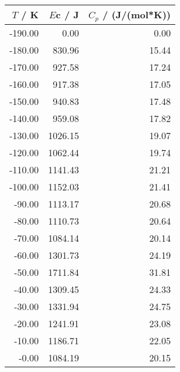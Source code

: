 \begin{tabular}{rrr}
\toprule
$T$ / K & $E$c / J & $C_p$ / (J/(mol*K)) \\
\midrule
-190.00 & 0.00 & 0.00 \\
-180.00 & 830.96 & 15.44 \\
-170.00 & 927.58 & 17.24 \\
-160.00 & 917.38 & 17.05 \\
-150.00 & 940.83 & 17.48 \\
-140.00 & 959.08 & 17.82 \\
-130.00 & 1026.15 & 19.07 \\
-120.00 & 1062.44 & 19.74 \\
-110.00 & 1141.43 & 21.21 \\
-100.00 & 1152.03 & 21.41 \\
-90.00 & 1113.17 & 20.68 \\
-80.00 & 1110.73 & 20.64 \\
-70.00 & 1084.14 & 20.14 \\
-60.00 & 1301.73 & 24.19 \\
-50.00 & 1711.84 & 31.81 \\
-40.00 & 1309.45 & 24.33 \\
-30.00 & 1331.94 & 24.75 \\
-20.00 & 1241.91 & 23.08 \\
-10.00 & 1186.71 & 22.05 \\
-0.00 & 1084.19 & 20.15 \\
\bottomrule
\end{tabular}
